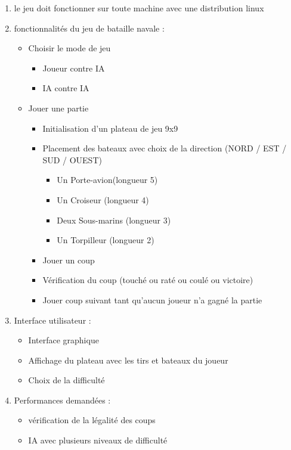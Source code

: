 \documentclass[a4paper,oneside]{article}
\begin{document}
\begin{enumerate}
    	\item le jeu doit fonctionner sur toute machine avec une distribution linux
    	\item fonctionnalités du jeu de bataille navale :
    	\begin{itemize}
    		\item Choisir le mode de jeu
    		\begin{itemize}
    			\item Joueur contre IA
    			\item IA contre IA
    		\end{itemize}
    		\item Jouer une partie
    		\begin{itemize}
    			\item Initialisation d'un plateau de jeu 9x9
    			\item Placement des bateaux avec choix de la direction (NORD / EST / SUD / OUEST)
    			\begin{itemize}
    					\item Un Porte-avion(longueur 5)
    					\item Un Croiseur (longueur 4)
    					\item Deux Sous-marins (longueur 3)
    					\item Un Torpilleur (longueur 2)
	    		\end{itemize}
    			\item Jouer un coup
    			\item Vérification du coup (touché ou raté ou coulé ou victoire)
    			\item Jouer coup suivant tant qu'aucun joueur n'a gagné la partie
    		\end{itemize}
    	\end{itemize}
    	\item Interface utilisateur :
    	\begin{itemize}
    		\item Interface graphique
    		\item Affichage du plateau avec les tirs et bateaux du joueur
    		\item Choix de la difficulté
    	\end{itemize}
    	\item Performances demandées :
    	\begin{itemize}
    		\item vérification de la légalité des coups
    		\item IA avec plusieurs niveaux de difficulté
    	\end{itemize}
\end{enumerate}
\end{document}

